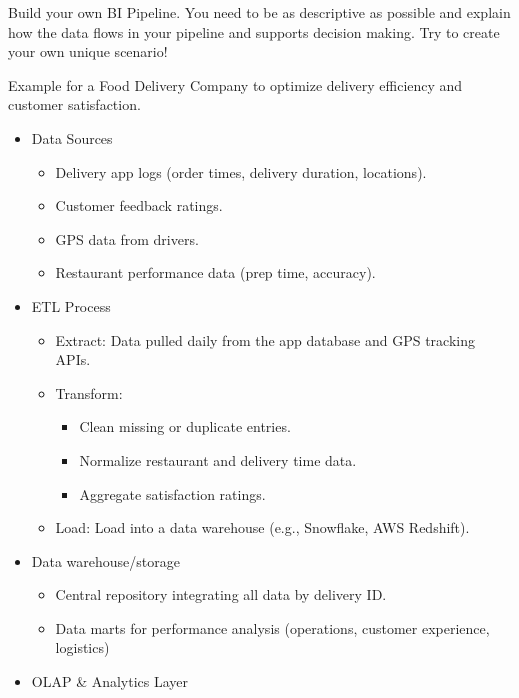 \indent 

Build your own BI Pipeline. You need to be as descriptive as possible and explain how the data flows in your pipeline and supports decision making. Try to create your own unique scenario!

Example for a Food Delivery Company to optimize delivery efficiency and customer satisfaction.

\begin{itemize}
    \item Data Sources
        \begin{itemize}
            \item Delivery app logs (order times, delivery duration, locations).
            \item Customer feedback ratings.
            \item GPS data from drivers.
            \item Restaurant performance data (prep time, accuracy).
        \end{itemize}
    \item ETL Process
        \begin{itemize}
            \item Extract: Data pulled daily from the app database and GPS tracking APIs.
            \item Transform:
                \begin{itemize}
                    \item Clean missing or duplicate entries.
                    \item Normalize restaurant and delivery time data.
                    \item Aggregate satisfaction ratings.
                \end{itemize}
            \item Load: Load into a data warehouse (e.g., Snowflake, AWS Redshift).
        \end{itemize}
    \item Data warehouse/storage
        \begin{itemize}
            \item Central repository integrating all data by delivery ID.
            \item Data marts for performance analysis (operations, customer experience, logistics)
        \end{itemize}
    \item OLAP \& Analytics Layer
        \begin{itemize}

\end{itemize}
\end{itemize}
